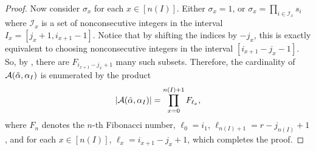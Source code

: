 \documentclass[10pt]{article}
\newcommand{\hr}[0]{\Tilde{\alpha}}
\newcommand{\newmu}[0]{\alpha_I}
\newcommand{\thealtset}[0]{\mathcal{A}(\hr,\newmu)}
\begin{document}
\begin{proof}
    Now consider $\sigma_x$ for each $x\in[n(I)]$. Either $\sigma_x=1$, or $\sigma_x=\prod_{i\in\mathcal{I}_x}s_i$ where 
    $\mathcal{I}_x$ is a set of nonconsecutive integers in the interval $I_x = [j_x+1,i_{x+1}-1]$. Notice that by shifting the indices by $-j_x$, this is exactly equivalent to choosing nonconsecutive integers in the interval $[i_{x+1}-j_x-1]$. So, by , there are $F_{i_{x+1}-j_x+1}$ many such subsets. Therefore, the cardinality of $\thealtset$ is enumerated by the product  
    \begin{equation}
        \left|\mathcal{A}(\hr,\alpha_I)\right|=\prod_{x=0}^{n(I)+1}F_{\ell_x},\notag
    \end{equation}
    where $F_n$ denotes the $n$-th Fibonacci number, $\ell_0=i_1$, $\ell_{n(I)+1}=r-j_{n(I)}+1$, and for each $x\in[n(I)]$, $\ell_x=i_{x+1}-j_x+1$, which completes the proof.
\end{proof}
\end{document}
